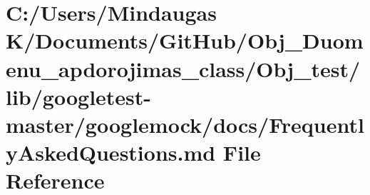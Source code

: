 \hypertarget{_obj__test_2lib_2googletest-master_2googlemock_2docs_2_frequently_asked_questions_8md}{}\section{C\+:/\+Users/\+Mindaugas K/\+Documents/\+Git\+Hub/\+Obj\+\_\+\+Duomenu\+\_\+apdorojimas\+\_\+class/\+Obj\+\_\+test/lib/googletest-\/master/googlemock/docs/\+Frequently\+Asked\+Questions.md File Reference}
\label{_obj__test_2lib_2googletest-master_2googlemock_2docs_2_frequently_asked_questions_8md}

